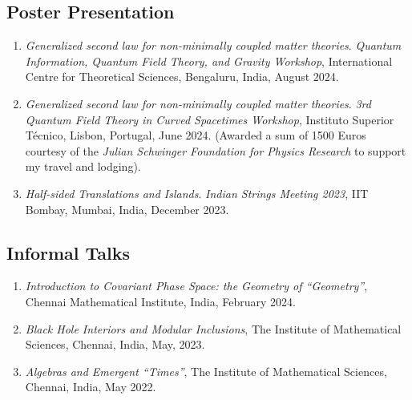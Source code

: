 \documentclass[11pt, letterpaper]{article}
\newcommand{\imsc}{The Institute of Mathematical Sciences, Chennai}
\begin{document}
	\subsection{Poster Presentation}
	\begin{enumerate}
		\item \textit{Generalized second law for non-minimally coupled matter theories}. \textit{Quantum Information, Quantum Field Theory, and Gravity Workshop}, International Centre for Theoretical Sciences, Bengaluru, India, August 2024.
		
		\item \textit{Generalized second law for non-minimally coupled matter theories}. \textit{3rd Quantum Field Theory in Curved Spacetimes Workshop}, Instituto Superior T\'ecnico, Lisbon, Portugal, June 2024. (Awarded a sum of 1500 Euros courtesy of the \textit{Julian Schwinger Foundation for Physics Research} to support my travel and lodging).
		
		\item \textit{Half-sided Translations and Islands}. \textit{Indian Strings Meeting 2023}, IIT Bombay, Mumbai, India, December 2023.
	\end{enumerate}
	
	\subsection{Informal Talks}
	\begin{enumerate}
		\item \textit{Introduction to Covariant Phase Space: the Geometry of ``Geometry''}, Chennai Mathematical Institute, India, February 2024.
		
		\item \textit{Black Hole Interiors and Modular Inclusions}, \imsc, India, May, 2023.
		
		\item \textit{Algebras and Emergent ``Times''}, \imsc, India, May 2022.
	\end{enumerate}
	
\end{document}
